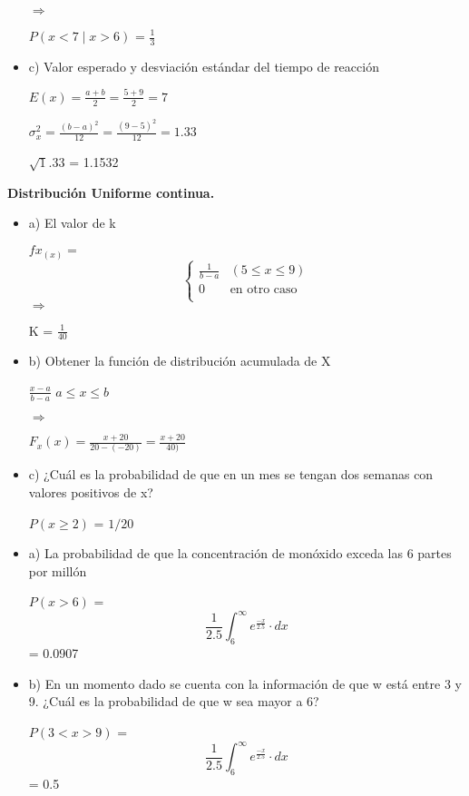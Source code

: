 \documentclass{oxmathproblems}
\begin{document}
\begin{questions}
\begin{itemize}
$\Rightarrow$

$ P(x < 7 \mid x > 6) $ = $\frac{1}{3}$


\item  c) Valor esperado y desviación estándar del tiempo de reacción

$E(x) = \frac{a+b}{2} = \frac{5+9}{2} = 7$


$\sigma_x^2 = \frac{(b-a)^2}{12} = \frac{(9-5)^2}{12} = 1.33$


$\sqrt1.33$ = 1.1532 
\end{itemize}


\miquestion \textbf {Distribución Uniforme continua.} 

\begin{itemize}
\item  a) El valor de k 

 
$ fx_(x) = $
$$$$
\[   
     \begin{cases}
\frac{1}{b-a} & (5 \leq x \leq 9)\\
       0 & \text{en otro caso} \\
     \end{cases}
\]
$$$$
$\Rightarrow$
 
 K = $\frac{1}{40}$

\item  b) Obtener la función de distribución acumulada de X

$\frac{x-a}{b-a}$    $ a \leq x \leq b$

$\Rightarrow$

$ F_x(x) = \frac{x+20}{20-(-20)}  = \frac{x+20}{40)} $

\item  c) ¿Cuál es la probabilidad de que en un mes se tengan dos semanas con valores positivos de x?

$ P(x \geq 2)$ = $ 1/20 $
\end{itemize}

\miquestion
\begin{itemize}
\item a) La probabilidad de que la concentración de monóxido exceda las 6 partes por millón

$P(x>6)$
= 
\begin{equation}
 \frac{1}{2.5} \int_6^\infty {e^{\frac{-x}{2.5}}} \cdot dx
\end{equation}  
= 0.0907



\item b) En un momento dado se cuenta con la información de que w está entre 3 y 9. ¿Cuál es la probabilidad de que w sea mayor a 6?

$P(3<x>9)$
= 
\begin{equation}
 \frac{1}{2.5} \int_6^\infty {e^{\frac{-x}{2.5}}} \cdot dx
\end{equation}  
= 0.5
\end{itemize}


\end {questions}
\end{document}
